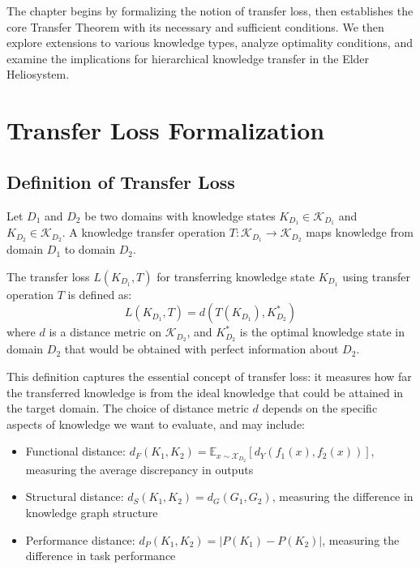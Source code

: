 The chapter begins by formalizing the notion of transfer loss, then establishes the core Transfer Theorem with its necessary and sufficient conditions. We then explore extensions to various knowledge types, analyze optimality conditions, and examine the implications for hierarchical knowledge transfer in the Elder Heliosystem.

\section{Transfer Loss Formalization}

\subsection{Definition of Transfer Loss}

\begin{definition}
Let $D_1$ and $D_2$ be two domains with knowledge states $K_{D_1} \in \mathcal{K}_{D_1}$ and $K_{D_2} \in \mathcal{K}_{D_2}$. A knowledge transfer operation $T: \mathcal{K}_{D_1} \to \mathcal{K}_{D_2}$ maps knowledge from domain $D_1$ to domain $D_2$.
\end{definition}

\begin{definition}
The transfer loss $L(K_{D_1}, T)$ for transferring knowledge state $K_{D_1}$ using transfer operation $T$ is defined as:
\begin{equation}
L(K_{D_1}, T) = d(T(K_{D_1}), K_{D_2}^*)
\end{equation}
where $d$ is a distance metric on $\mathcal{K}_{D_2}$, and $K_{D_2}^*$ is the optimal knowledge state in domain $D_2$ that would be obtained with perfect information about $D_2$.
\end{definition}

This definition captures the essential concept of transfer loss: it measures how far the transferred knowledge is from the ideal knowledge that could be attained in the target domain. The choice of distance metric $d$ depends on the specific aspects of knowledge we want to evaluate, and may include:

\begin{itemize}
    \item Functional distance: $d_F(K_1, K_2) = \mathbb{E}_{x \sim \mathcal{X}_{D_2}}[d_Y(f_1(x), f_2(x))]$, measuring the average discrepancy in outputs
    \item Structural distance: $d_S(K_1, K_2) = d_G(G_1, G_2)$, measuring the difference in knowledge graph structure
    \item Performance distance: $d_P(K_1, K_2) = |P(K_1) - P(K_2)|$, measuring the difference in task performance
\end{itemize}

